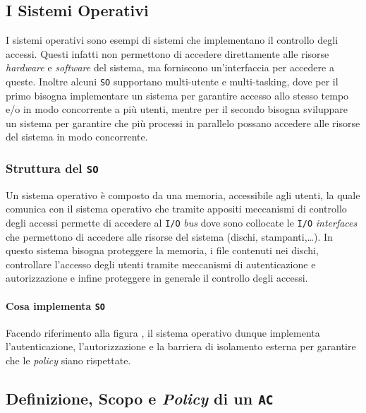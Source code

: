     \subsection{I Sistemi Operativi}
        I sistemi operativi sono esempi di sistemi che implementano il controllo degli accessi. Questi infatti non permettono di accedere direttamente alle risorse \textit{hardware} e \textit{software} del sistema, ma forniscono un'interfaccia per accedere a queste. Inoltre alcuni \texttt{SO} supportano multi-utente e multi-tasking, dove per il primo bisogna implementare un sistema per garantire accesso allo stesso tempo e/o in modo concorrente a più utenti, mentre per il secondo bisogna sviluppare un sistema per garantire che più processi in parallelo possano accedere alle risorse del sistema in modo concorrente.
        \subsubsection{Struttura del \texttt{SO}}
            Un sistema operativo è composto da una memoria, accessibile agli utenti, la quale comunica con il sistema operativo che tramite appositi meccanismi di controllo degli accessi permette di accedere al \texttt{I/O} \textit{bus} dove sono collocate le \texttt{I/O} \textit{interfaces} che permettono di accedere alle risorse del sistema (dischi, stampanti,\dots).\newline
            In questo sistema bisogna proteggere la memoria, i file contenuti nei dischi, controllare l'accesso degli utenti tramite meccanismi di autenticazione e autorizzazione e infine proteggere in generale il controllo degli accessi.
            \paragraph{Cosa implementa \texttt{SO}} Facendo riferimento alla figura , il sistema operativo dunque implementa l'autenticazione, l'autorizzazione e la barriera di isolamento esterna per garantire che le \textit{policy} siano rispettate.
    \subsection{Definizione, Scopo e \textit{Policy} di un \texttt{AC}}
